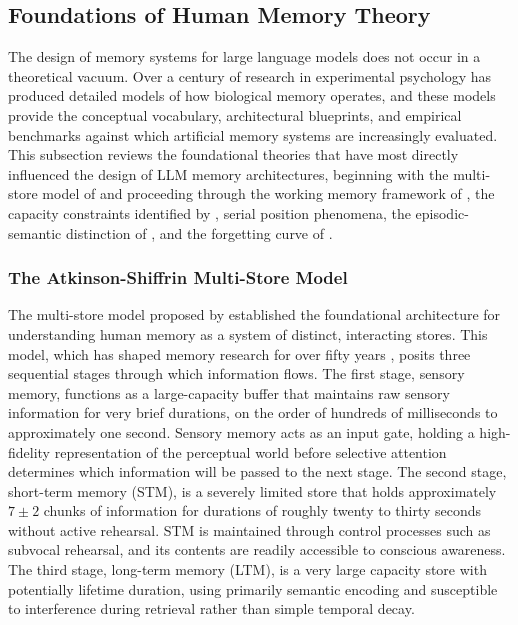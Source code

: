 \documentclass[11pt,letterpaper]{article}
\begin{document}
\subsection{Foundations of Human Memory Theory}

The design of memory systems for large language models does not occur in a theoretical vacuum. Over a century of research in experimental psychology has produced detailed models of how biological memory operates, and these models provide the conceptual vocabulary, architectural blueprints, and empirical benchmarks against which artificial memory systems are increasingly evaluated. This subsection reviews the foundational theories that have most directly influenced the design of LLM memory architectures, beginning with the multi-store model of \cite{atkinson1968human} and proceeding through the working memory framework of \cite{baddeley1974working}, the capacity constraints identified by \cite{miller1956magical}, serial position phenomena, the episodic-semantic distinction of \cite{tulving1972episodic}, and the forgetting curve of \cite{ebbinghaus1885memory}.

\subsubsection{The Atkinson-Shiffrin Multi-Store Model}

The multi-store model proposed by \cite{atkinson1968human} established the foundational architecture for understanding human memory as a system of distinct, interacting stores. This model, which has shaped memory research for over fifty years \cite{neath2019fifty}, posits three sequential stages through which information flows. The first stage, sensory memory, functions as a large-capacity buffer that maintains raw sensory information for very brief durations, on the order of hundreds of milliseconds to approximately one second. Sensory memory acts as an input gate, holding a high-fidelity representation of the perceptual world before selective attention determines which information will be passed to the next stage. The second stage, short-term memory (STM), is a severely limited store that holds approximately $7 \pm 2$ chunks of information \cite{miller1956magical} for durations of roughly twenty to thirty seconds without active rehearsal. STM is maintained through control processes such as subvocal rehearsal, and its contents are readily accessible to conscious awareness. The third stage, long-term memory (LTM), is a very large capacity store with potentially lifetime duration, using primarily semantic encoding and susceptible to interference during retrieval rather than simple temporal decay.
\end{document}
